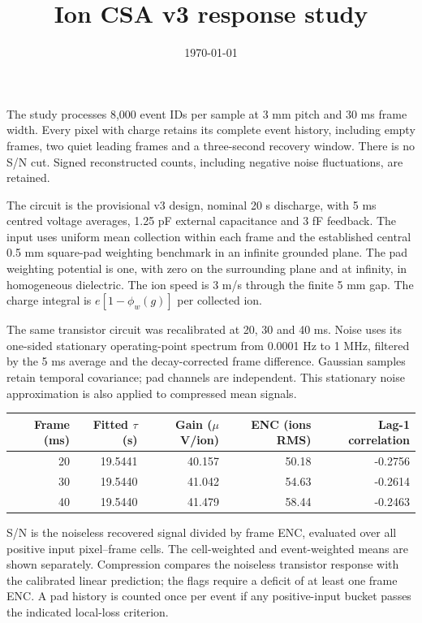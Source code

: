 \documentclass[10pt,a4paper]{article}
\title{Ion CSA v3 response study}
\date{\today}
\begin{document}
\maketitle
The study processes 8,000 event IDs per sample at 3 mm pitch
and 30 ms frame width. Every pixel with charge retains its
complete event history, including empty frames, two quiet leading frames and a
three-second recovery window. There is no S/N cut. Signed reconstructed counts,
including negative noise fluctuations, are retained.

The circuit is the provisional v3 design, nominal 20 s discharge, with 5 ms
centred voltage averages, 1.25 pF external capacitance and 3 fF feedback. The input
uses uniform mean collection within each frame and the established central
0.5 mm square-pad weighting benchmark in an infinite grounded plane. The pad
weighting potential is one, with zero on the surrounding plane and at infinity,
in homogeneous dielectric. The ion speed is 3 m/s through the finite 5 mm gap.
The charge integral is $e[1-\phi_w(g)]$ per collected ion.

The same transistor circuit was recalibrated at 20, 30 and 40 ms. Noise uses its
one-sided stationary operating-point spectrum from 0.0001 Hz to 1 MHz, filtered
by the 5 ms average and the decay-corrected frame difference. Gaussian samples
retain temporal covariance; pad channels are independent. This stationary noise
approximation is also applied to compressed mean signals.
\begin{center}\begin{tabular}{rrrrr}\toprule
Frame (ms) & Fitted $\tau$ (s) & Gain ($\mu$V/ion) & ENC (ions RMS) & Lag-1 correlation\\\midrule
20 & 19.5441 & 40.157 & 50.18 & -0.2756 \\
30 & 19.5440 & 41.042 & 54.63 & -0.2614 \\
40 & 19.5440 & 41.479 & 58.44 & -0.2463 \\
\bottomrule\end{tabular}\end{center}

S/N is the noiseless recovered signal divided by frame ENC, evaluated over all
positive input pixel--frame cells. The cell-weighted and event-weighted means
are shown separately. Compression compares the noiseless transistor response
with the calibrated linear prediction; the flags require a deficit of at least
one frame ENC. A pad history is counted once per event if any positive-input
bucket passes the indicated local-loss criterion.
\end{document}
